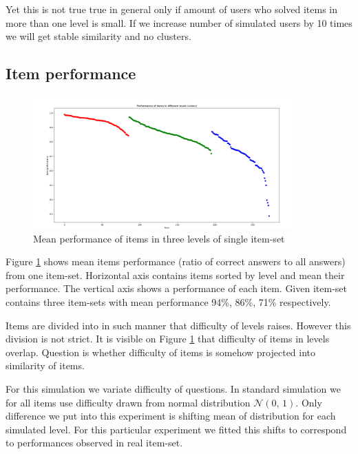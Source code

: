 \documentclass[
  digital, %
  table,   %
  nolof,     %
  nolot,     %
  nocover,
  color,
  final, %
]{fithesis3}
\begin{document}
Yet this is not true true in general only if amount of users who solved items in more than one level is small. If we increase number of simulated users by 10 times we will get stable similarity and no clusters.


\subsection{Item performance}\label{item-performance}

\begin{figure}
  \includegraphics[width=10cm]{img/items_performance_levels}
  \caption{Mean performance of items in three levels of single item-set}
  \label{fig:item_performance_levels}
\end{figure}

Figure \ref{fig:item_performance_levels} shows mean items performance (ratio of correct answers to all answers) from one item-set. Horizontal axis contains items sorted by level and mean their performance. The vertical axis shows a performance of each item. Given item-set contains three item-sets with mean performance 94\%, 86\%, 71\% respectively.

Items are divided into in such manner that difficulty of levels raises. However this division is not strict. It is visible on Figure \ref{fig:item_performance_levels} that difficulty of items in levels overlap. Question is whether difficulty of items is somehow projected into similarity of items.

For this simulation we variate difficulty of questions. In standard simulation we for all items use difficulty drawn from normal distribution $\mathcal{N}(0,\,1)$. Only difference we put into this experiment is shifting mean of distribution for each simulated level. For this particular experiment we fitted this shifts to correspond to performances observed in real item-set.
\end{document}
